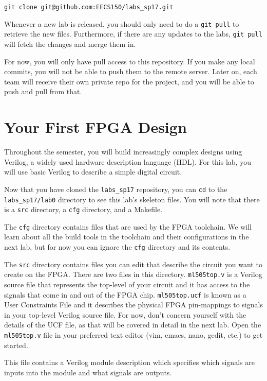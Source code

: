 \documentclass[11pt]{article}
\begin{document}
\begin{verbatim}
git clone git@github.com:EECS150/labs_sp17.git
\end{verbatim}

Whenever a new lab is released, you should only need to do a \verb|git pull| to retrieve the new files. Furthermore, if there are any updates to the labs, \verb|git pull| will fetch the changes and merge them in.

For now, you will only have pull access to this repository. If you make any local commits, you will not be able to push them to the remote server. Later on, each team will receive their own private repo for the project, and you will be able to push and pull from that.

\section{Your First FPGA Design}
Throughout the semester, you will build increasingly complex designs using Verilog, a widely used hardware description language (HDL). For this lab, you will use basic Verilog to describe a simple digital circuit.

Now that you have cloned the \verb|labs_sp17| repository, you can \verb|cd| to the 
\verb|labs_sp17/lab0| directory to see this lab's skeleton files. You will note that there is a \verb|src| directory, a \verb|cfg| directory, and a Makefile.

The \verb|cfg| directory contains files that are used by the FPGA toolchain. We will learn about all the build tools in the toolchain and their configurations in the next lab, but for now you can ignore the \verb|cfg| directory and its contents.

The \verb|src| directory contains files you can edit that describe the circuit you want to create on the FPGA. There are two files in this directory. \verb|ml505top.v| is a Verilog source file that represents the top-level of your circuit and it has access to the signals that come in and out of the FPGA chip. \verb|ml505top.ucf| is known as a User Constraints File and it describes the physical FPGA pin-mappings to signals in your top-level Verilog source file. For now, don't concern yourself with the details of the UCF file, as that will be covered in detail in the next lab. Open the \verb|ml505top.v| file in your preferred text editor (vim, emacs, nano, gedit, etc.) to get started.

This file contains a Verilog module description which specifies which signals are inputs into the module and what signals are outputs.
\end{document}
